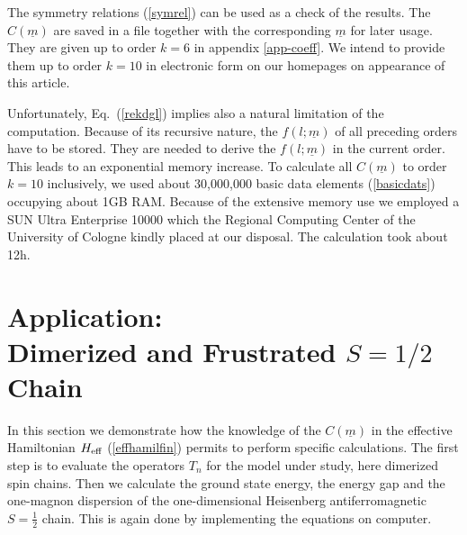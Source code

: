 The symmetry relations  (\ref{symrel}) can be used as a check of the results.
The $C(\underline{m})$ are saved in a file together with the corresponding 
$\underline{m}$ for later usage. They are given up to order $k=6$ in appendix 
\ref{app-coeff}. We intend to provide them up to order $k=10$ in electronic
 form on our homepages on appearance of this article.

Unfortunately, Eq.~(\ref{rekdgl}) implies also a natural limitation of the 
computation. Because of its recursive nature, the $f(l;\underline{m})$ of all 
preceding orders have to be stored. They are needed to derive the 
$f(l;\underline{m})$ in the current order. This leads to an exponential memory 
increase. To calculate all $C(\underline{m})$ to order $k=10$ inclusively, 
we used about 30,000,000 basic data elements (\ref{basicdats})
 occupying about 1GB RAM. Because 
of the extensive memory use we employed a SUN Ultra Enterprise 10000 which the
 Regional Computing Center of the University of Cologne kindly placed at our 
disposal. The calculation took about 12h. 

\section{Application:\\ Dimerized and Frustrated $S=1/2$ Chain}
In this section we demonstrate how the knowledge of the $C(\underline{m})$
in the effective Hamiltonian $H_{\rm{eff}}$ (\ref{effhamilfin}) permits to
perform specific calculations. The first 
step is to evaluate the operators $T_n$  for the model under study, here
dimerized spin chains.
Then we calculate the ground state energy, the energy gap  and the one-magnon 
dispersion of the one-dimensional Heisenberg antiferromagnetic $S=\frac{1}{2}$
 chain. This is again done by implementing the equations on computer.

